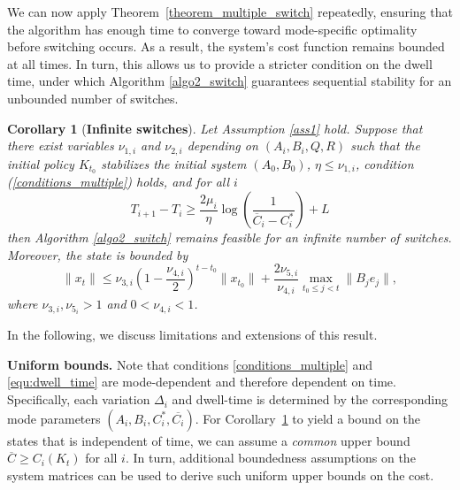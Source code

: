 \documentclass[letterpaper, 10 pt, conference]{ieeeconf}  %
\newtheorem{theorem}{Theorem}
\newtheorem{coro}{Corollary}
\begin{document}
We can now apply Theorem~\ref{theorem_multiple_switch} repeatedly, ensuring that the algorithm has enough time to converge toward mode-specific optimality before switching occurs. As a result, the system’s cost function remains bounded at all times. In turn, this allows us to provide a stricter condition on the dwell time, under which Algorithm \ref{algo2_switch} guarantees sequential stability for an unbounded number of switches.

\begin{coro}[\textbf{Infinite switches}]
\label{thm:dwell}
Let Assumption \ref{ass1} hold. Suppose that there exist variables $\nu_{1,i}$ and $\nu_{2,i}$ depending on $(A_i, B_i, Q, R)$ such that the initial policy $K_{t_0}$ stabilizes the initial system $(A_0, B_0)$, $\eta \leq \nu_{1,i}$, condition (\ref{conditions_multiple}) holds, and for all $i$
\begin{equation}\label{equ:dwell_time}
T_{i+1}-T_i \geq  \frac{2\mu_i}{\eta}\log\left( \frac{1}{\overline{C}_i - C_i^*} \right) +L
\end{equation}
then Algorithm \ref{algo2_switch} remains feasible for an infinite number of switches. Moreover, the state is bounded by    
\begin{equation}\label{eq:statebound}
    \|x_t\| \leq \nu_{3,i} (1-\frac{\nu_{4,i}}{2})^{t-t_0}\|x_{t_0}\| +\frac{2\nu_{5,i}}{\nu_{4,i}} \underset{t_0\leq j < t}{\max} \|B_j e_j\|,
\end{equation} 
where $\nu_{3,i}, \nu_{5_i} > 1$ and $0<\nu_{4,i}<1$. 
\end{coro} \vspace{2mm}
 
In the following, we discuss limitations and extensions of this result.

\textbf{Uniform bounds.} Note that conditions \eqref{conditions_multiple} and \eqref{equ:dwell_time} are mode-dependent and therefore dependent on time. Specifically, each variation $\Delta_i$ and dwell-time is determined by the corresponding mode parameters $(A_i, B_i, C_i^*, \overline{C_i})$. For Corollary~\ref{thm:dwell} to yield a bound on the states that is independent of time, we can assume a \textit{common} upper bound $\overline{C} \geq C_i(K_t)$ for all $i$. In turn, additional boundedness assumptions on the system matrices can be used to derive such uniform upper bounds on the cost. 
\end{document}
